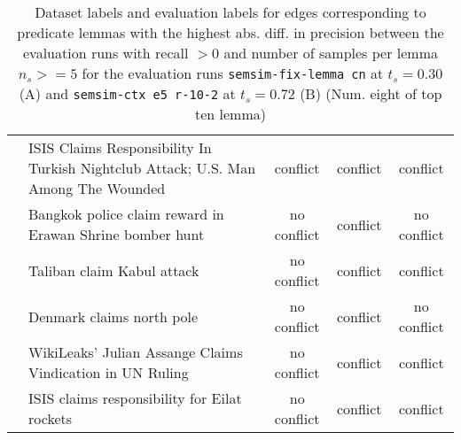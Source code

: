 \begin{sidewaystable}[ht]
\begin{tabular}{l p{13cm} ccc}
& ISIS Claims Responsibility In Turkish Nightclub Attack; U.S. Man Among The Wounded & conflict & conflict & conflict \\
& Bangkok police claim reward in Erawan Shrine bomber hunt & no conflict & conflict & no conflict \\
& Taliban claim Kabul attack & no conflict & conflict & conflict \\
& Denmark claims north pole & no conflict & conflict & no conflict \\
& WikiLeaks' Julian Assange Claims Vindication in UN Ruling & no conflict & conflict & conflict \\
& ISIS claims responsibility for Eilat rockets & no conflict & conflict & conflict \\
\bottomrule
\end{tabular}
\caption{Dataset labels and evaluation labels for edges corresponding to predicate lemmas with the highest abs. diff. in precision between the evaluation runs with recall \(> 0\) and number of samples per lemma \(n_s >= 5\) for the evaluation runs \texttt{semsim-fix-lemma cn} at \(t_s = 0.30\) (A) and \texttt{semsim-ctx e5 r-10-2} at \(t_s = 0.72\) (B)  (Num. eight of top ten lemma)}
\label{tab:ples-labels-4}
\end{sidewaystable}


